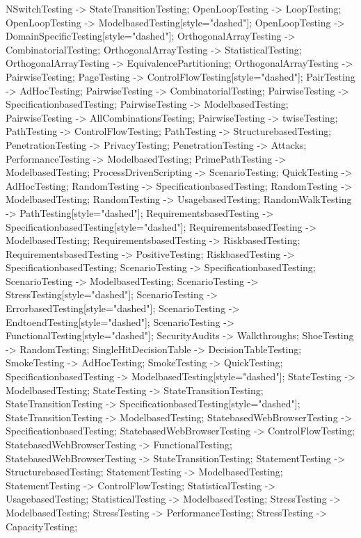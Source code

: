 \documentclass{article}
\begin{document}
{NSwitchTesting -> StateTransitionTesting;
OpenLoopTesting -> LoopTesting;
OpenLoopTesting -> ModelbasedTesting[style="dashed"];
OpenLoopTesting -> DomainSpecificTesting[style="dashed"];
OrthogonalArrayTesting -> CombinatorialTesting;
OrthogonalArrayTesting -> StatisticalTesting;
OrthogonalArrayTesting -> EquivalencePartitioning;
OrthogonalArrayTesting -> PairwiseTesting;
PageTesting -> ControlFlowTesting[style="dashed"];
PairTesting -> AdHocTesting;
PairwiseTesting -> CombinatorialTesting;
PairwiseTesting -> SpecificationbasedTesting;
PairwiseTesting -> ModelbasedTesting;
PairwiseTesting -> AllCombinationsTesting;
PairwiseTesting -> twiseTesting;
PathTesting -> ControlFlowTesting;
PathTesting -> StructurebasedTesting;
PenetrationTesting -> PrivacyTesting;
PenetrationTesting -> Attacks;
PerformanceTesting -> ModelbasedTesting;
PrimePathTesting -> ModelbasedTesting;
ProcessDrivenScripting -> ScenarioTesting;
QuickTesting -> AdHocTesting;
RandomTesting -> SpecificationbasedTesting;
RandomTesting -> ModelbasedTesting;
RandomTesting -> UsagebasedTesting;
RandomWalkTesting -> PathTesting[style="dashed"];
RequirementsbasedTesting -> SpecificationbasedTesting[style="dashed"];
RequirementsbasedTesting -> ModelbasedTesting;
RequirementsbasedTesting -> RiskbasedTesting;
RequirementsbasedTesting -> PositiveTesting;
RiskbasedTesting -> SpecificationbasedTesting;
ScenarioTesting -> SpecificationbasedTesting;
ScenarioTesting -> ModelbasedTesting;
ScenarioTesting -> StressTesting[style="dashed"];
ScenarioTesting -> ErrorbasedTesting[style="dashed"];
ScenarioTesting -> EndtoendTesting[style="dashed"];
ScenarioTesting -> FunctionalTesting[style="dashed"];
SecurityAudits -> Walkthroughs;
ShoeTesting -> RandomTesting;
SingleHitDecisionTable -> DecisionTableTesting;
SmokeTesting -> AdHocTesting;
SmokeTesting -> QuickTesting;
SpecificationbasedTesting -> ModelbasedTesting[style="dashed"];
StateTesting -> ModelbasedTesting;
StateTesting -> StateTransitionTesting;
StateTransitionTesting -> SpecificationbasedTesting[style="dashed"];
StateTransitionTesting -> ModelbasedTesting;
StatebasedWebBrowserTesting -> SpecificationbasedTesting;
StatebasedWebBrowserTesting -> ControlFlowTesting;
StatebasedWebBrowserTesting -> FunctionalTesting;
StatebasedWebBrowserTesting -> StateTransitionTesting;
StatementTesting -> StructurebasedTesting;
StatementTesting -> ModelbasedTesting;
StatementTesting -> ControlFlowTesting;
StatisticalTesting -> UsagebasedTesting;
StatisticalTesting -> ModelbasedTesting;
StressTesting -> ModelbasedTesting;
StressTesting -> PerformanceTesting;
StressTesting -> CapacityTesting;
}
\end{document}

